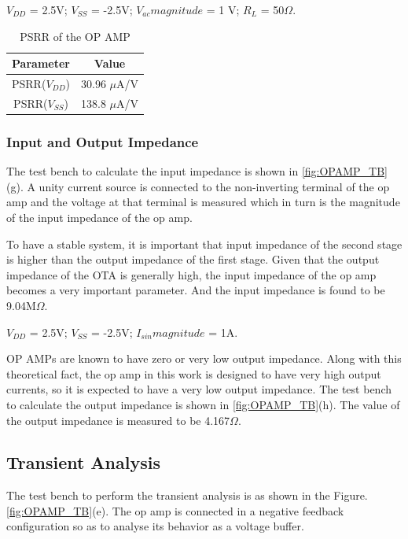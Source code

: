 $V_{DD}$ = 2.5V; $V_{SS}$ = -2.5V; $V_{ac} magnitude $ = 1 V; $R_L$ = 50$\Omega$.

\begin{table} [H]
\centering
\begin{tabular}{@{}cc@{}}
\toprule
Parameter					& Value				\\ \midrule
PSRR($V_{DD}$)				& 30.96 $\mu$A/V		\\
PSRR($V_{SS}$)				& 138.8 $\mu$A/V		\\
\bottomrule
\end{tabular}
\caption{PSRR of the OP AMP}
\label{tab:OPAMP_PSRR}
\end{table}

\subsubsection{Input and Output Impedance}
The test bench to calculate the input impedance is shown in \ref{fig:OPAMP_TB}(g). A unity current source is connected to the non-inverting terminal of the op amp and the voltage at that terminal is measured which in turn is the magnitude of the input impedance of the op amp.

To have a stable system, it is important that input impedance of the second stage is higher than the output impedance of the first stage. Given that the output impedance of the OTA is generally high, the input impedance of the op amp becomes a very important parameter. And the input impedance is found to be 9.04M$\Omega$.

$V_{DD}$ = 2.5V; $V_{SS}$ = -2.5V; $I_{sin} magnitude $ = 1A.

OP AMPs are known to have zero or very low output impedance. Along with this theoretical fact, the op amp in this work is designed to have very high output currents, so it is expected to have a very low output impedance. The test bench to calculate the output impedance is shown in \ref{fig:OPAMP_TB}(h). The value of the output impedance is measured to be 4.167$\Omega$.

\subsection{Transient Analysis}
The test bench to perform the transient analysis is as shown in the Figure.\ref{fig:OPAMP_TB}(e). The op amp is connected in a negative feedback configuration so as to analyse its behavior as a voltage buffer.

